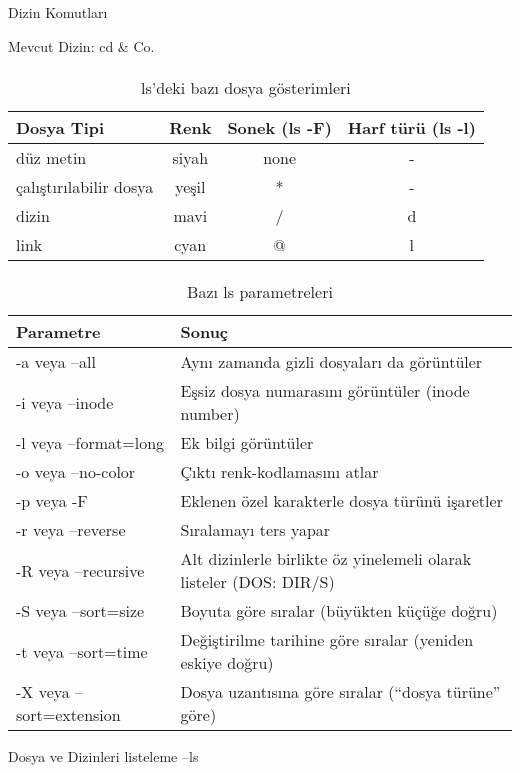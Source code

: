 \begin{section}{Dizin Komutları}
\begin{subsection}{Mevcut Dizin: cd \& Co.}
\paragraph{}{
\begin {table}[H]
\caption {ls'deki bazı dosya gösterimleri} \label{tab:tablo61} 
\begin{tabular}{l c c c}
\hline
Dosya Tipi & Renk & Sonek (ls -F) & Harf türü (ls -l) \\
\hline
düz metin 	&	siyah & none & - \\
çalıştırılabilir dosya 	&	yeşil & * & - \\
dizin 	&	mavi & / & d \\
link 	&	cyan & @ & l \\
\hline
\end{tabular}
\end {table}
}

\paragraph{}{
\begin {table}[H]
\caption {Bazı ls parametreleri} \label{tab:tablo62} 
\begin{tabular}{l l}
\hline
Parametre & Sonuç \\
\hline
-a veya --all 	&	Aynı zamanda gizli dosyaları da görüntüler \\
-i veya --inode 	&	Eşsiz dosya numarasını görüntüler (inode number) \\
-l veya --format=long 	&	Ek bilgi görüntüler \\
-o veya --no-color 	&	Çıktı renk-kodlamasını atlar \\
-p veya -F 	&	Eklenen özel karakterle dosya türünü işaretler \\
-r veya --reverse 	&	Sıralamayı ters yapar \\
-R veya --recursive 	&	Alt dizinlerle birlikte öz yinelemeli olarak listeler (DOS: DIR/S) \\
-S veya --sort=size 	&	Boyuta göre sıralar (büyükten küçüğe doğru) \\
-t veya --sort=time 	&	Değiştirilme tarihine göre sıralar (yeniden eskiye doğru) \\
-X veya --sort=extension 	&	Dosya uzantısına göre sıralar (“dosya türüne” göre) \\
\hline
\end{tabular}
\end {table}
}
\end{subsection}
\begin{subsection}{Dosya ve Dizinleri listeleme --ls}


\end{subsection}
\end{section}
